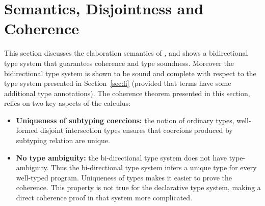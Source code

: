 \section{Semantics, Disjointness and Coherence}
\label{sec:disjoint}
This section discusses the elaboration semantics of \name, and shows a
bidirectional type system that guarantees coherence and type
soundness. Moreover the bidirectional type system is shown to be sound
and complete with respect to the type system presented in
Section~\ref{sec:fi} (provided that terms have some additional type
annotations). 
The coherence theorem presented in this section, relies on two key
aspects of the calculus:

\begin{itemize}

\item {\bf Uniqueness of subtyping coercions:} the notion of ordinary
  types, well-formed disjoint intersection types ensures that
  coercions produced by subtyping relation are unique.

\item {\bf No type ambiguity:} the bi-directional type system does not
  have type-ambiguity. Thus the bi-directional type system infers a
  unique type for every well-typed program.  Uniqueness of
  types makes it easier to prove the coherence.  This property is not
  true for the declarative type system, making a direct coherence
  proof in that system more complicated.

\end{itemize}

\begin{comment}
The key 
aspect to ensuring coherence is the notion of disjoint intersection.

\bruno{How to pitch this section:}
Three things to ensure coherence:

1) Ordinary + Well-formedness ensure that coercions produced by
subtyping relation are unique; 

2) Bi-directional type-system ensures that unambiguous types: the 
additional type annotations are enough to remove ambiguity, and ensure
that the calculus always elaborates every program to a unique
expression in the target language.
\end{comment}

